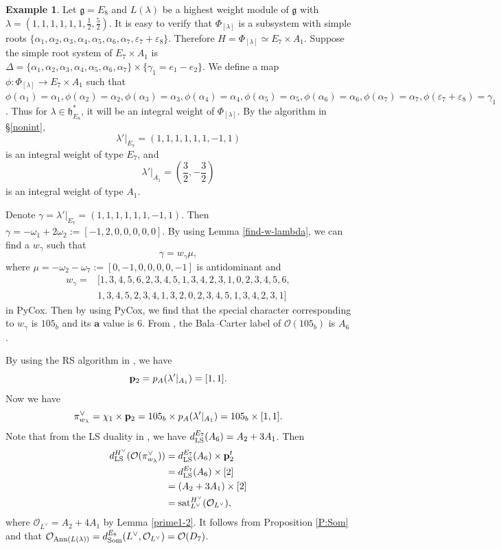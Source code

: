 \documentclass[reqno,12pt]{amsart}
\numberwithin{equation}{section}
\theoremstyle{plain}
\theoremstyle{definition}
\newtheorem{ex}[Thm]{Example}
\newcommand{\lam}{\lambda}
\newcommand{\ep}{\varepsilon}
\newcommand{\aff}{ \mathbf{a} }
\begin{document}
\begin{ex}

Let $\mathfrak{g}=E_8$ and $L(\lam)$ be a highest weight module of $\mathfrak{g}$ with  $\lambda=(1,1,1,1,1,1, \frac{1}{2}, \frac{5}{2})$. It is easy to verify that $\Phi_{[\lambda]}$ is a subsystem with simple roots $\{ \alpha_1, \alpha_2,\alpha_3,\alpha_4,\alpha_5,\alpha_6,\alpha_7,\ep_7+\ep_8\}$. Therefore $H=\Phi_{[\lambda]}\simeq E_7\times A_1$. Suppose the simple root system of $E_7\times A_1$ is $\Delta=\{\alpha_1, \alpha_2,\alpha_3,\alpha_4,\alpha_5,\alpha_6,\alpha_7\}\times \{\gamma_1=e_1-e_2\}$.
    We define a map $\phi: \Phi_{[\lambda]} \rightarrow E_7\times A_1$ such that $\phi(\alpha_1)=\alpha_1, \phi(\alpha_2)=\alpha_2, \phi(\alpha_3)=\alpha_3, \phi(\alpha_4)=\alpha_4,\phi(\alpha_5)=\alpha_5,\phi(\alpha_6)=\alpha_6,\phi(\alpha_7)=\alpha_7,\phi(\ep_7+\ep_8)=\gamma_1$.
   Thus for $\lam\in \mathfrak{h}_{E_8}^* $, it will be an integral weight  of ${\Phi_{[\lambda]}}$. By the algorithm in \S \ref{nonint}, $$\lam'|_{{E_7}}
    =(1,1,1,1,1,1,-1,1)$$ is an integral weight of type $E_7$,         and $$\lam'|_{{A_1}}=\left(\frac{3}{2},-\frac{3}{2}\right)$$ is an integral weight of type $A_1$. 
   
  
   Denote $\gamma=\lam'|_{E_7}=(1,1,1,1,1,1,-1,1)$.
Then $\gamma=-\omega_1+2\omega_2:=[-1,2,0,0,0,0,0]$. By using Lemma \ref{find-w-lambda}, we can find a $w_{\gamma}$ such that  $$\gamma=w_{\gamma}\mu,$$ 
where  $\mu=-\omega_2-\omega_7:=[0,-1,0,0,0,0,-1]$ is antidominant and  
\begin{align*}
   w_{\gamma}=&[1,3,4,5,6,2,3,4,5,1,3,4,2,3,1,0,2,3,4,5,6,\\
   &1,3,4,5,2,3,4,1,3,2,0,2,3,4,5,1,3,4,2,3,1] 
\end{align*} in PyCox. Then by using PyCox, we find that the special character corresponding to $w_{\gamma}$ is
$105_b$ and its $\aff$ value is $6$. From \cite[p. 430]{Ca85}, the Bala--Carter label of $\mathcal{O}(105_b)$ is $A_6$.




By using the RS algorithm in \cite{BX}, we have
$${\bf p}_{2}= p_{A}(\lam'|_{A_1})=[1,1].$$
Now we have
$$\pi^{\vee}_{w_{\lam}}=\chi_{1}\times {\bf p}_{2}=105_b\times p_{A}(\lam'|_{A_1})=105_b\times [1,1].$$ 
Note that from  the LS duality in \cite[p. 443]{Ca85} , we have $d_{\rm LS}^{E_7}(A_6)=A_2+3A_1$. 
Then \begin{align*}
    d_{\rm LS}^{H^\vee} (\mathcal{O}(\pi_{w_{\lam}}^\vee))&=d_{\rm LS}^{E_7}(A_6) \times {\bf p}^t_{2} \\
    &=d_{\rm LS}^{E_7}(A_6) \times [2]\\
    &=(A_2+3A_1)\times [2]\\
    &= {\rm sat}_{L^\vee}^{H^\vee} (\mathcal{O}_{L^\vee}),
\end{align*}
where $\mathcal{O}_{L^\vee}=A_2+4A_1 $ by Lemma \ref{prime1-2}. 
It follows from Proposition \ref{P:Som} and \cite[Table X]{Sommers} that $\mathcal{O}_{{\rm Ann}(L(\lambda))} = d_{\rm Som}^{E_8}(L^\vee, \mathcal{O}_{L^\vee}) = \mathcal{O}(D_7)$.
\end{ex}
\end{document}
